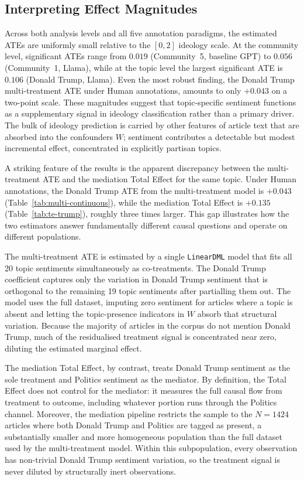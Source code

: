 \subsection{Interpreting Effect Magnitudes}
\label{sec:effect-magnitudes}

Across both analysis levels and all five annotation paradigms, the estimated ATEs are uniformly small relative to the $[0, 2]$ ideology scale. At the community level, significant ATEs range from $0.019$ (Community~5, baseline GPT) to $0.056$ (Community~1, Llama), while at the topic level the largest significant ATE is $0.106$ (Donald Trump, Llama). Even the most robust finding, the Donald Trump multi-treatment ATE under Human annotations, amounts to only $+0.043$ on a two-point scale. These magnitudes suggest that topic-specific sentiment functions as a supplementary signal in ideology classification rather than a primary driver. The bulk of ideology prediction is carried by other features of article text that are absorbed into the confounders $W$; sentiment contributes a detectable but modest incremental effect, concentrated in explicitly partisan topics.

A striking feature of the results is the apparent discrepancy between the multi-treatment ATE and the mediation Total Effect for the same topic. Under Human annotations, the Donald Trump ATE from the multi-treatment model is $+0.043$ (Table~\ref{tab:multi-continuous}), while the mediation Total Effect is $+0.135$ (Table~\ref{tab:te-trump}), roughly three times larger. This gap illustrates how the two estimators answer fundamentally different causal questions and operate on different populations.

The multi-treatment ATE is estimated by a single \texttt{LinearDML} model that fits all 20 topic sentiments simultaneously as co-treatments. The Donald Trump coefficient captures only the variation in Donald Trump sentiment that is orthogonal to the remaining 19 topic sentiments after partialling them out. The model uses the full dataset, imputing zero sentiment for articles where a topic is absent and letting the topic-presence indicators in $W$ absorb that structural variation. Because the majority of articles in the corpus do not mention Donald Trump, much of the residualised treatment signal is concentrated near zero, diluting the estimated marginal effect.

The mediation Total Effect, by contrast, treats Donald Trump sentiment as the sole treatment and Politics sentiment as the mediator. By definition, the Total Effect does not control for the mediator: it measures the full causal flow from treatment to outcome, including whatever portion runs through the Politics channel. Moreover, the mediation pipeline restricts the sample to the $N = \num{1424}$ articles where both Donald Trump and Politics are tagged as present, a substantially smaller and more homogeneous population than the full dataset used by the multi-treatment model. Within this subpopulation, every observation has non-trivial Donald Trump sentiment variation, so the treatment signal is never diluted by structurally inert observations.

